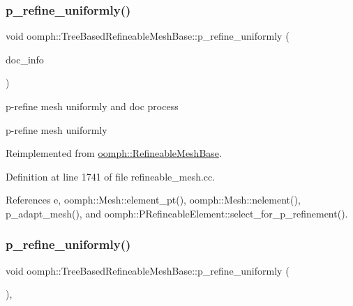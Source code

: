 \subsubsection{\texorpdfstring{p\+\_\+refine\+\_\+uniformly()}{p\_refine\_uniformly()}\hspace{0.1cm}{\footnotesize\ttfamily [1/2]}}
{\footnotesize\ttfamily void oomph\+::\+Tree\+Based\+Refineable\+Mesh\+Base\+::p\+\_\+refine\+\_\+uniformly (\begin{DoxyParamCaption}\item[{\hyperlink{classoomph_1_1DocInfo}{Doc\+Info} \&}]{doc\+\_\+info }\end{DoxyParamCaption})\hspace{0.3cm}{\ttfamily [virtual]}}



p-\/refine mesh uniformly and doc process 

p-\/refine mesh uniformly 

Reimplemented from \hyperlink{classoomph_1_1RefineableMeshBase_a443bfce7586aecfa50b4b8a6c6078710}{oomph\+::\+Refineable\+Mesh\+Base}.



Definition at line 1741 of file refineable\+\_\+mesh.\+cc.



References e, oomph\+::\+Mesh\+::element\+\_\+pt(), oomph\+::\+Mesh\+::nelement(), p\+\_\+adapt\+\_\+mesh(), and oomph\+::\+P\+Refineable\+Element\+::select\+\_\+for\+\_\+p\+\_\+refinement().

\mbox{\label{classoomph_1_1TreeBasedRefineableMeshBase_ae922698aeb358f174c37dac5101c5369}} 
\subsubsection{\texorpdfstring{p\+\_\+refine\+\_\+uniformly()}{p\_refine\_uniformly()}\hspace{0.1cm}{\footnotesize\ttfamily [2/2]}}
{\footnotesize\ttfamily void oomph\+::\+Tree\+Based\+Refineable\+Mesh\+Base\+::p\+\_\+refine\+\_\+uniformly (\begin{DoxyParamCaption}{ }\end{DoxyParamCaption})\hspace{0.3cm}{\ttfamily [inline]}, {\ttfamily [virtual]}}



